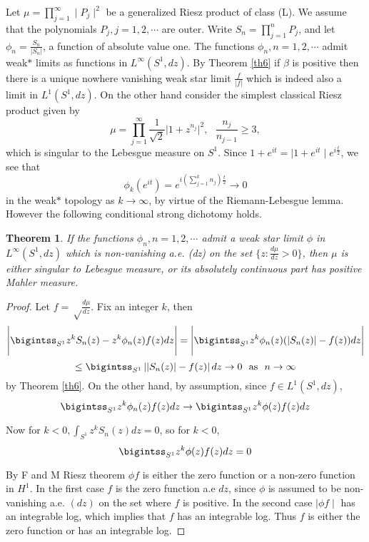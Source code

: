 \documentclass{amsart}
\newtheorem{Th}{Theorem}[section]
\theoremstyle{definition}
\theoremstyle{remark}
\numberwithin{equation}{section}
\newcommand{\1}{\mathbb{1}}
\begin{document}
Let  $\mu = \prod_{j=1}^\infty \mid P_j\mid^2$ be a generalized Riesz product of class (L). We assume that the polynomials $P_j, j=1,2,\cdots$ are outer. Write
 $S_n = \prod_{j=1}^nP_j$, and let  $\phi_n = \frac{S_n}{|S_n|}$, a function of absolute value one.
 The functions $\phi_n, n=1,2,\cdots$ admit weak$*$ limits as functions in $L^{\infty}(S^1, dz)$. By Theorem \ref{th6} if $\beta$ is positive then there is a unique nowhere vanishing weak star limit $\frac{f}{| f|}$ which is indeed also a limit in $L^1(S^1, dz)$. On the other hand consider the simplest classical Riesz product
given by
$$\mu = \prod_{j=1}^\infty  \frac{1}{\sqrt 2}\Big| 1 + z^{n_j}\Big|^2,~~~ \frac{n_j}{n_{j-1}} \geq 3,$$ which is singular to the Lebesgue measure on $S^1$.
Since $ 1 + e^{it}={\mid 1 + e^{it}\mid} e^{i\frac{t}{2}}$, we see that
$$\phi_k (e^{it})=e^{i\left(\sum_{j=1}^k n_j\right)\frac{t}{2}} \longrightarrow 0$$
in the weak$*$ topology as $k \rightarrow \infty$, by virtue of the Riemann-Lebesgue lemma. However the following conditional strong dichotomy holds.
\begin{Th}\label{th7}
If the functions $\phi_n, n =1,2,\cdots$ admit a weak star limit $\phi$ in $L^{\infty}(S^1, dz)$  which is non-vanishing a.e. (dz) on the set $\{z: \frac{d\mu}{dz} > 0\}$, then  $\mu$ is either singular to Lebesgue measure, or its absolutely continuous part has positive Mahler measure.
\end{Th}
\begin{proof}
Let $f = \sqrt\frac{d\mu}{dz}$. Fix an integer $k$, then
$$\Biggl|\bigintss_{S^1}z^kS_n(z) - z^k\phi_n(z)f(z)dz\Biggr| = \Biggl|\bigintss_{S^1}z^k\phi_n(z)(\left| S_n(z)\right| - f(z))dz\Biggr|$$
$$\leq \bigintss_{S^1}\left| \left|S_n(z)\right| - f(z)\right| dz \rightarrow 0 ~~{\rm{as}}~~ n \rightarrow \infty$$
by Theorem \ref{th6}.
On the other hand, by assumption, since $f\in L^1(S^1,dz)$,
$$\bigintss_{S^1}z^k\phi_n(z)f(z)dz \rightarrow \bigintss_{S^1}z^k\phi (z) f(z)dz$$

Now for $k < 0, \int_{S^1}z^k S_n(z)dz =0$, so for $k < 0$,
$$\bigintss_{S^1}z^k\phi (z)f(z)dz =0$$

By F and M Riesz theorem $\phi f$ is either the zero function or a non-zero function in $H^1$. In the first case
$f$ is the zero function a.e $dz$, since $\phi$ is assumed to be non-vanishing a.e. $(dz)$ on the set where $f$ is positive. In the second case
 $\mid\phi f\mid$ has an integrable log, which implies that $f$ has an integrable log. Thus $f$ is either the zero function or has  an integrable log.
\end{proof}
\end{document}
